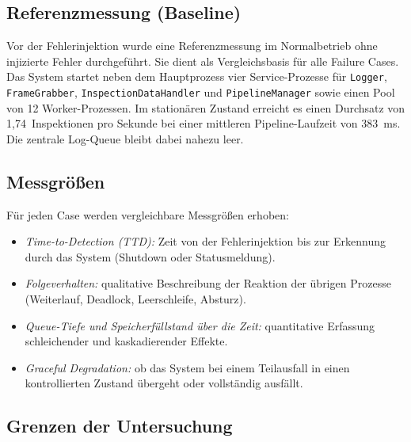 \subsection{Referenzmessung (Baseline)}
\label{sec:methodik-baseline}

Vor der Fehlerinjektion wurde eine Referenzmessung im Normalbetrieb ohne injizierte Fehler
durchgeführt. Sie dient als Vergleichsbasis für alle Failure Cases. Das System startet
neben dem Hauptprozess vier Service-Prozesse für \texttt{Logger}, \texttt{FrameGrabber},
\texttt{Inspection\allowbreak{}Data\allowbreak{}Handler} und \texttt{PipelineManager} sowie
einen Pool von 12 Worker-Prozessen. Im stationären Zustand erreicht es einen Durchsatz von
1,74~Inspektionen pro Sekunde bei einer mittleren Pipeline-Laufzeit von 383~ms. Die
zentrale Log-Queue bleibt dabei nahezu leer.

\subsection{Messgrößen}
\label{sec:methodik-messgroessen}

Für jeden Case werden vergleichbare Messgrößen erhoben:

\begin{itemize}
    \item \textit{Time-to-Detection (TTD):} Zeit von der Fehlerinjektion bis zur
          Erkennung durch das System (Shutdown oder Statusmeldung).
    \item \textit{Folgeverhalten:} qualitative Beschreibung der Reaktion der übrigen
          Prozesse (Weiterlauf, Deadlock, Leerschleife, Absturz).
    \item \textit{Queue-Tiefe und Speicherfüllstand über die Zeit:} quantitative
          Erfassung schleichender und kaskadierender Effekte.
    \item \textit{Graceful Degradation:} ob das System bei einem Teilausfall in einen
          kontrollierten Zustand übergeht oder vollständig ausfällt.
\end{itemize}

\subsection{Grenzen der Untersuchung}
\label{sec:methodik-grenzen}

